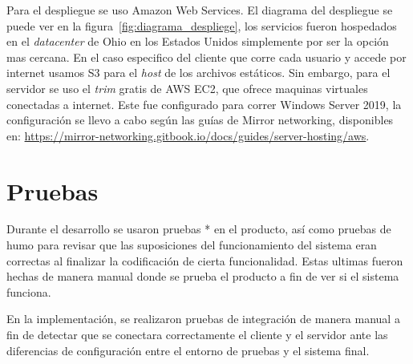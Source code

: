 Para el despliegue se uso Amazon Web Services. El diagrama del despliegue se puede ver en la figura~\ref{fig:diagrama_despliege}, los servicios fueron hospedados en el \textit{datacenter} de Ohio en los Estados Unidos simplemente por ser la opción mas cercana.
En el caso especifico del cliente que corre cada usuario y accede por internet usamos S3 para el \textit{host} de los archivos estáticos.
Sin embargo, para el servidor se uso el \textit{trim} gratis de AWS EC2, que ofrece maquinas virtuales conectadas a internet. Este fue configurado para correr Windows Server 2019, la configuración se llevo a cabo según las guías de Mirror networking, disponibles en: \url{https://mirror-networking.gitbook.io/docs/guides/server-hosting/aws}.

\section{Pruebas}
Durante el desarrollo se usaron pruebas * en el producto, así como pruebas de humo para revisar que las suposiciones del funcionamiento del sistema eran correctas al finalizar la codificación de cierta funcionalidad. Estas ultimas fueron hechas de manera manual donde se prueba el producto a fin de ver si el sistema funciona.

En la implementación, se realizaron pruebas de integración de manera manual a fin de detectar que se conectara correctamente el cliente y el servidor ante las diferencias de configuración entre el entorno de pruebas y el sistema final.